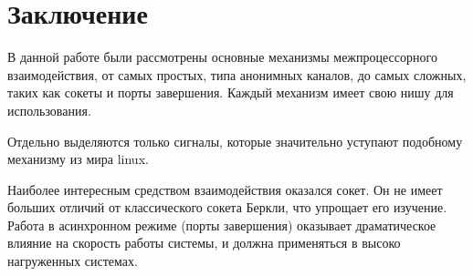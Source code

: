 \documentclass[a4paper, 12pt]{report}		%
\begin{document}
\chapter*{Заключение}

В данной работе были рассмотрены основные механизмы межпроцессорного взаимодействия, от самых простых, типа анонимных каналов, до самых сложных, таких как сокеты и порты завершения. Каждый механизм имеет свою нишу для использования.
\vspace{1em}

Отдельно выделяются только сигналы, которые значительно уступают подобному механизму из мира linux.
\vspace{1em}

Наиболее интересным средством взаимодействия оказался сокет. Он не имеет больших отличий от классического сокета Беркли, что упрощает его изучение. Работа в асинхронном режиме (порты завершения) оказывает драматическое влияние на скорость работы системы, и должна применяться в высоко нагруженных системах.
\end{document}
